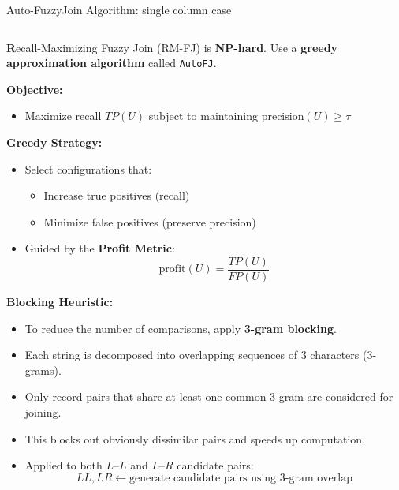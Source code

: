 \documentclass[8pt]{beamer} %
\begin{document}
\begin{frame}{Auto-FuzzyJoin Algorithm: single column case}
	\begin{columns}
		\begin{column}{0.55\textwidth}
			\textbf Recall-Maximizing Fuzzy Join (RM-FJ) is \textbf{NP-hard}. Use a \textbf{greedy approximation algorithm} called \texttt{AutoFJ}.
			
			\vspace{0.5em}
			\textbf{Objective:}
			\begin{itemize}
				\item Maximize recall $TP(U)$ subject to maintaining $\text{precision}(U) \geq \tau$
			\end{itemize}
			
			\textbf{Greedy Strategy:}
			\begin{itemize}
				\item Select configurations that:
				\begin{itemize}
					\item Increase true positives (recall)
					\item Minimize false positives (preserve precision)
				\end{itemize}
				\item Guided by the \textbf{Profit Metric}:
				$$
				\text{profit}(U) = \frac{TP(U)}{FP(U)}
				$$
			\end{itemize}
			
			\textbf{Blocking Heuristic:}
			\tiny
			\begin{itemize}
				\item To reduce the number of comparisons, apply \textbf{3-gram blocking}.
				\item Each string is decomposed into overlapping sequences of 3 characters (3-grams).
				\item Only record pairs that share at least one common 3-gram are considered for joining.
				\item This blocks out obviously dissimilar pairs and speeds up computation.
				\item Applied to both $L$–$L$ and $L$–$R$ candidate pairs:
				$$
				LL, LR \leftarrow \text{generate candidate pairs using 3-gram overlap}
				$$
			\end{itemize}

		\end{column}
		

\end{columns}
\end{frame}
\end{document}
